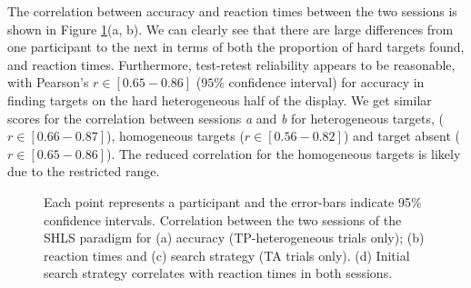 \documentclass[]{rsos}%
\begin{document}
The correlation between accuracy and reaction times between the two sessions is shown in Figure \ref{fig:splithalf_summary}(a, b). We can clearly see that there are large differences from one participant to the next in terms of both the proportion of hard targets found, and reaction times. Furthermore, test-retest reliability appears to be reasonable, with Pearson's $r \in [0.65-0.86]$ ($95\%$ confidence interval) for accuracy in finding targets on the hard heterogeneous half of the display. We get similar scores for the correlation between sessions \textit{a} and \textit{b} for heterogeneous targets, ($r \in [0.66-0.87]$), homogeneous targets ($r \in [0.56-0.82]$) and target absent ($r \in [0.65-0.86]$). The reduced correlation for the homogeneous targets is likely due to the restricted range.

\begin{figure}
\centering
{}
\caption{Each point represents a participant and the error-bars indicate 95\% confidence intervals. Correlation between the two sessions of the SHLS paradigm for (a)  accuracy (TP-heterogeneous trials only); (b) reaction times and (c) search strategy (TA trials only). (d) Initial search strategy correlates with reaction times in both sessions. }
\label{fig:splithalf_summary}
\end{figure}
\end{document}
